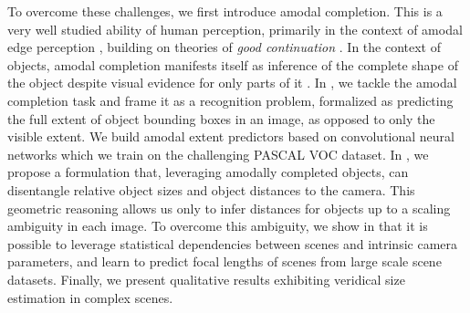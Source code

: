 To overcome these challenges, we first introduce amodal completion. This is a very well studied ability of human perception, primarily in the context of amodal edge perception \cite{kanizsa1979organization}, building on theories of \textit{good continuation} \cite{shipley2001fragments}. In the context of objects, amodal completion manifests itself as inference of the complete shape of the object despite visual evidence for only parts of it \cite{breckon2005amodal}.
In , we tackle the amodal completion task and frame it as a recognition problem, formalized as  predicting the full extent of object bounding boxes in an image, as opposed to only the visible extent. We build amodal extent predictors based on convolutional neural networks which we train on the challenging PASCAL VOC dataset. In , we propose a formulation that, leveraging amodally completed objects, can disentangle relative object sizes and object distances to the camera. This geometric reasoning allows us only to infer distances for objects up to a scaling ambiguity in each image. To overcome this ambiguity, we show in  that it is possible to leverage statistical dependencies between scenes and intrinsic camera parameters, and learn to predict focal lengths of scenes from large scale scene datasets. Finally, we present qualitative  results exhibiting veridical size estimation in complex scenes.




